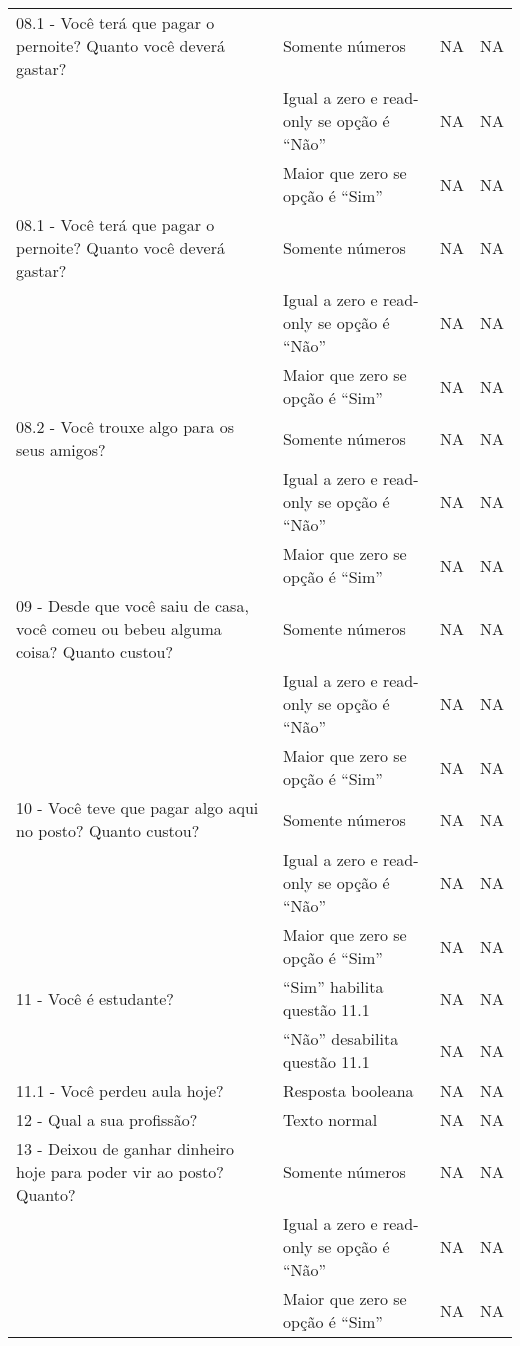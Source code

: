 \begin{longtable}{|p{}|p{}|p{}|p{}|}
08.1 - Você terá que pagar o pernoite? Quanto você deverá gastar? & Somente números & NA & NA \\ \cline{2-4} & Igual a zero e read-only se opção é ``Não'' & NA & NA \\ \cline{2-4} & Maior que zero se opção é ``Sim'' & NA & NA \\ \hline

08.1 - Você terá que pagar o pernoite? Quanto você deverá gastar? & Somente números & NA & NA \\ \cline{2-4} & Igual a zero e read-only se opção é ``Não'' & NA & NA \\ \cline{2-4} & Maior que zero se opção é ``Sim'' & NA & NA \\ \hline

08.2 - Você trouxe algo para os seus amigos? & Somente números & NA & NA \\ \cline{2-4} & Igual a zero e read-only se opção é ``Não'' & NA & NA \\ \cline{2-4} & Maior que zero se opção é ``Sim'' & NA & NA \\ \hline

09 - Desde que você saiu de casa, você comeu ou bebeu alguma coisa? Quanto custou? & Somente números & NA & NA \\ \cline{2-4} & Igual a zero e read-only se opção é ``Não'' & NA & NA \\ \cline{2-4} & Maior que zero se opção é ``Sim'' & NA & NA \\ \hline

10 - Você teve que pagar algo aqui no posto? Quanto custou? & Somente números & NA & NA \\ \cline{2-4} & Igual a zero e read-only se opção é ``Não'' & NA & NA \\ \cline{2-4} & Maior que zero se opção é ``Sim'' & NA & NA \\ \hline

11 - Você é estudante? & ``Sim'' habilita questão 11.1 & NA & NA \\ \cline{2-4} &  ``Não'' desabilita questão 11.1  & NA & NA \\ \hline

11.1 - Você perdeu aula hoje? & Resposta booleana & NA & NA \\ \hline

12 - Qual a sua profissão? & Texto normal & NA & NA \\ \hline

13 - Deixou de ganhar dinheiro hoje para poder vir ao posto? Quanto? & Somente números & NA & NA \\ \cline{2-4} & Igual a zero e read-only se opção é ``Não'' & NA & NA \\ \cline{2-4} & Maior que zero se opção é ``Sim'' & NA & NA \\ \hline


\end{longtable}
